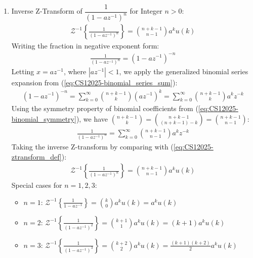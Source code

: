 \begin{enumerate}[label=\thesubsection.\arabic*, ref=\thesubsection.\theenumi, itemsep=0.5cm]
\item Inverse Z-Transform of $\dfrac{1}{(1 - a z^{-1})^n}$ for Integer $n > 0$:
\begin{align}
\mathcal{Z}^{-1}\left\{\frac{1}{(1 - a z^{-1})^n}\right\} = \binom{n + k - 1}{n - 1} a^k u(k) \label{eq:CS12025-inverse_z_power}
\end{align}
\solution
Writing the fraction in negative exponent form:
\begin{align}
\frac{1}{(1 - a z^{-1})^n} = (1 - a z^{-1})^{-n}
\end{align}
Letting $x = a z^{-1}$, where $|a z^{-1}| < 1$, we apply the generalized binomial series expansion from (\ref{eq:CS12025-binomial_series_sum}):
\begin{align}
(1 - a z^{-1})^{-n} = \sum_{k=0}^{\infty} \binom{n+k-1}{k} (a z^{-1})^k = \sum_{k=0}^{\infty} \binom{n+k-1}{k} a^k z^{-k}
\end{align}
Using the symmetry property of binomial coefficients from (\ref{eq:CS12025-binomial_symmetry}), we have $\binom{n+k-1}{k} = \binom{n+k-1}{(n+k-1) - k} = \binom{n+k-1}{n-1}$:
\begin{align}
\frac{1}{(1 - a z^{-1})^n} = \sum_{k=0}^{\infty} \binom{n + k - 1}{n - 1} a^k z^{-k}
\end{align}
Taking the inverse Z-transform by comparing with (\ref{eq:CS12025-ztransform_def}):
\begin{align}
\mathcal{Z}^{-1}\left\{\frac{1}{(1 - a z^{-1})^n}\right\} = \binom{n + k - 1}{n - 1} a^k u(k)
\end{align}
Special cases for $n = 1, 2, 3$:
\begin{itemize}
    \item $n = 1$: $\mathcal{Z}^{-1}\left\{\frac{1}{1 - a z^{-1}}\right\} = \binom{k}{0} a^k u(k) = a^k u(k)$
    \item $n = 2$: $\mathcal{Z}^{-1}\left\{\frac{1}{(1 - a z^{-1})^2}\right\} = \binom{k+1}{1} a^k u(k) = (k+1) a^k u(k)$
    \item $n = 3$: $\mathcal{Z}^{-1}\left\{\frac{1}{(1 - a z^{-1})^3}\right\} = \binom{k+2}{2} a^k u(k) = \frac{(k+1)(k+2)}{2} a^k u(k)$
\end{itemize}


\end{enumerate}
